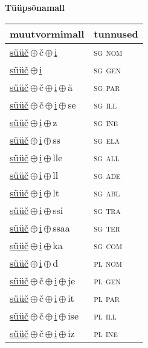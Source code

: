 

\vspace{3.5em}
\noindent \begin{minipage}{\textwidth}
\noindent \textbf{Tüüpsõnamall \,}\\

\begin{sideways}
\begin{tabular}{l l}
muutvormimall & tunnused \\
\hline
\underline{süüč}\,$\oplus$\,č\,$\oplus$\,\underline{i} & \textsc{ sg nom } \\
\underline{süüč}\,$\oplus$\,\underline{i} & \textsc{ sg gen } \\
\underline{süüč}\,$\oplus$\,č\,$\oplus$\,\underline{i}\,$\oplus$\,ä & \textsc{ sg par } \\
\underline{süüč}\,$\oplus$\,č\,$\oplus$\,\underline{i}\,$\oplus$\,se & \textsc{ sg ill } \\
\underline{süüč}\,$\oplus$\,\underline{i}\,$\oplus$\,z & \textsc{ sg ine } \\
\underline{süüč}\,$\oplus$\,\underline{i}\,$\oplus$\,ss & \textsc{ sg ela } \\
\underline{süüč}\,$\oplus$\,\underline{i}\,$\oplus$\,lle & \textsc{ sg all } \\
\underline{süüč}\,$\oplus$\,\underline{i}\,$\oplus$\,ll & \textsc{ sg ade } \\
\underline{süüč}\,$\oplus$\,\underline{i}\,$\oplus$\,lt & \textsc{ sg abl } \\
\underline{süüč}\,$\oplus$\,\underline{i}\,$\oplus$\,ssi & \textsc{ sg tra } \\
\underline{süüč}\,$\oplus$\,\underline{i}\,$\oplus$\,ssaa & \textsc{ sg ter } \\
\underline{süüč}\,$\oplus$\,\underline{i}\,$\oplus$\,ka & \textsc{ sg com } \\
\underline{süüč}\,$\oplus$\,\underline{i}\,$\oplus$\,d & \textsc{ pl nom } \\
\underline{süüč}\,$\oplus$\,č\,$\oplus$\,\underline{i}\,$\oplus$\,je & \textsc{ pl gen } \\
\underline{süüč}\,$\oplus$\,č\,$\oplus$\,\underline{i}\,$\oplus$\,it & \textsc{ pl par } \\
\underline{süüč}\,$\oplus$\,č\,$\oplus$\,\underline{i}\,$\oplus$\,ise & \textsc{ pl ill } \\
\underline{süüč}\,$\oplus$\,č\,$\oplus$\,\underline{i}\,$\oplus$\,iz & \textsc{ pl ine } \\

\end{tabular}
\end{sideways}
\end{minipage}

